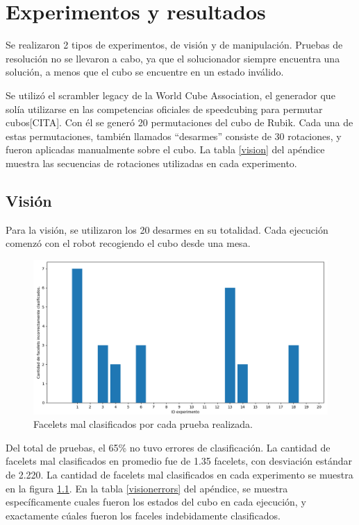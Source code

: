\chapter{Experimentos y resultados}

Se realizaron 2 tipos de experimentos, de visión y de manipulación. Pruebas de resolución no se llevaron a cabo, ya que el solucionador siempre encuentra una solución, a menos que el cubo se encuentre en un estado inválido.

Se utilizó el scrambler legacy de la World Cube Association, el generador que solía utilizarse en las competencias oficiales de speedcubing para permutar  cubos[CITA]. Con él se generó 20 permutaciones del cubo de Rubik. Cada una de estas permutaciones, también llamados ``desarmes'' consiste de 30 rotaciones, y fueron aplicadas manualmente sobre el cubo. La tabla \ref{vision} del apéndice muestra las secuencias de rotaciones utilizadas en cada experimento.

\section{Visión}
Para la visión, se utilizaron los 20 desarmes en su totalidad. Cada ejecución comenzó con el robot recogiendo el cubo desde una mesa.

\begin{figure}[h!]
	\centering
	\includegraphics[width=\textwidth]{figures/error_facelet}
	\caption{Facelets mal clasificados por cada prueba realizada.}
	\label{erroresfacelets}
\end{figure}
Del total de pruebas, el 65\% no tuvo errores de clasificación. La cantidad de facelets mal clasificados en promedio fue de 1.35 facelets, con desviación estándar de 2.220. La cantidad de facelets mal clasificados en cada experimento se muestra en la figura \ref{erroresfacelets}. En la tabla \ref{visionerrors} del apéndice, se muestra específicamente cuales fueron los estados del cubo en cada ejecución, y exactamente cúales fueron los faceles indebidamente clasificados.

